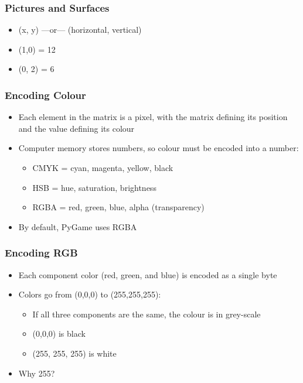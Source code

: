 
\begin{frame}
	\frametitle{Pictures and Surfaces}
	
	\begin{itemize}
		\item (x, y) ---or--- (horizontal, vertical)
		\item (1,0) = 12
		\item (0, 2) = 6
	\end{itemize}
\end{frame}

\begin{frame}
	\frametitle{Encoding Colour}
	
	\begin{itemize}
		\item Each element in the matrix is a pixel, with the matrix defining its position and the value defining  its colour
		\item Computer memory stores numbers, so colour must be encoded into a number:
		\begin{itemize}
			\item CMYK = cyan, magenta, yellow, black
			\item HSB = hue, saturation, brightness
			\item RGBA = red, green, blue, alpha (transparency)
		\end{itemize}
		\item By default, PyGame uses RGBA
	\end{itemize}
\end{frame}

\begin{frame}
	\frametitle{Encoding RGB}
	
	\begin{itemize}
		\item Each component color (red, green, and blue) is encoded as a single byte
		\item Colors go from (0,0,0) to (255,255,255):
		\begin{itemize}
			\item If all three components are the same, the colour is in grey-scale
			\item (0,0,0) is black
			\item (255, 255, 255) is white
		\end{itemize}
		\item Why 255?
	\end{itemize}
\end{frame}

